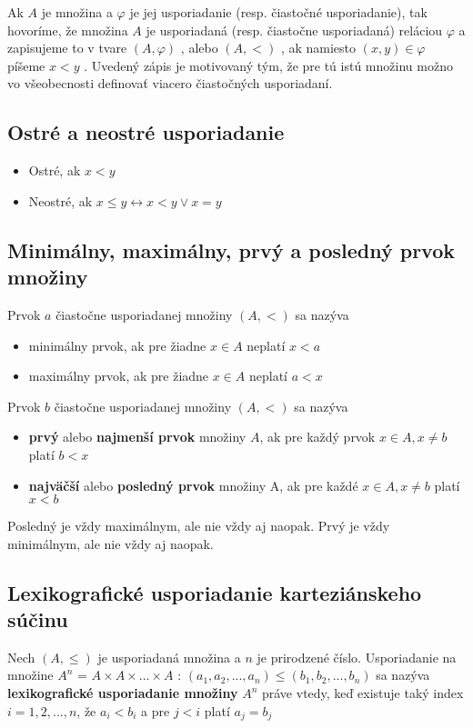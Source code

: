 		Ak $A$ je množina a $\varphi$ je jej usporiadanie (resp. čiastočné usporiadanie), tak hovoríme, že množina $A$ je usporiadaná (resp. čiastočne usporiadaná) reláciou $\varphi$ a zapisujeme to v tvare $( A, \varphi )$ , alebo $( A, < )$ , ak namiesto $( x, y) \in \varphi $ píšeme $x < y$ . Uvedený zápis je motivovaný tým, že pre tú istú množinu možno vo všeobecnosti definovať viacero čiastočných usporiadaní.

	\subsection*{Ostré a neostré usporiadanie}
		\begin{itemize}
			\item Ostré, ak $x<y$
			\item Neostré, ak $x \leq y \leftrightarrow x < y \vee x = y$
		\end{itemize}
	\subsection*{Minimálny, maximálny, prvý a posledný prvok množiny}
		Prvok $a$ čiastočne usporiadanej množiny $( A, < )$ sa nazýva
		\begin{itemize}
			\item minimálny prvok, ak pre žiadne $x \in A$ neplatí $x < a$
			\item maximálny prvok, ak pre žiadne $x \in A$ neplatí $a < x$
		\end{itemize}
		Prvok $b$ čiastočne usporiadanej množiny $( A, <)$ sa nazýva
		\begin{itemize} 
		\item \textbf{prvý} alebo \textbf{najmenší prvok} množiny $A$, ak pre každý prvok $x \in A, x \neq b$ platí $b < x$
		\item  \textbf{najväčší} alebo \textbf{posledný prvok} množiny A, ak pre každé $x \in A, x \neq b$ platí $x < b$
		\end{itemize}
		
		Posledný je vždy maximálnym, ale nie vždy aj naopak.
		Prvý je vždy minimálnym, ale nie vždy aj naopak.

	\subsection*{Lexikografické usporiadanie karteziánskeho súčinu}
		Nech $(A, \leq )$ je usporiadaná množina a $n$ je prirodzené číslo.
		Usporiadanie na množine $A^{n}$ = $A \times A \times ... \times A$ : $(a_{1}, a_{2}, ..., a_{n}) \leq  (b_{1}, b_{2}, ..., b_{n})$ sa nazýva \textbf{lexikografické usporiadanie množiny} $A^n$ práve vtedy, keď existuje taký index $i = 1, 2, ..., n$, že $a_{i} < b_{i}$ a pre $j < i$ platí $a_{j} = b_{j}$\\

